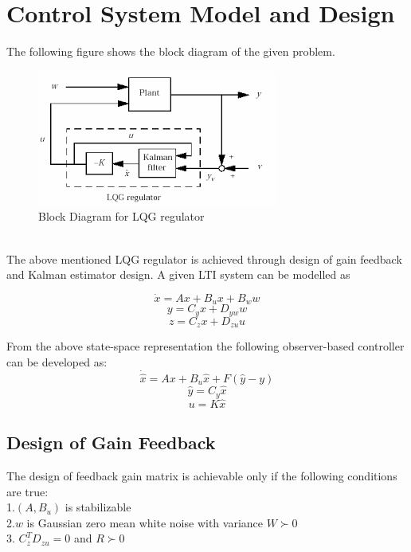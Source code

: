\documentclass[journal,onecolumn]{IEEEtran}
\begin{document}
\section{Control System Model and Design}

The following figure shows the block diagram of the given problem.
\begin{figure}[h!]
\centering

 \includegraphics[scale=1.0]{blockdiagram.png}
  \caption{Block Diagram for LQG regulator}
\end{figure}
\\
The above mentioned LQG regulator is achieved through design of gain feedback and Kalman estimator design.
A given LTI system can be modelled as 

\begin{equation}
    \dot x = Ax + B_{u}x + B_{w}w
\end{equation}
\begin{equation}
    y = C_{y}x + D_{yw}w 
    \end{equation}
    \begin{equation}
    z = C_{z}x + D_{zu}u
     \end{equation}

From the above state-space representation the following observer-based controller can be developed as:
\begin{equation}
    \dot {\hat x} = Ax + B_{u}{\hat x} + F({\hat y}-y)
\end{equation}
\begin{equation}
    {\hat y} = C_{y}{\hat x}
    \end{equation}
    \begin{equation}
    u = K{\hat x}
     \end{equation}
\subsection{Design of Gain Feedback}
The design of feedback gain matrix is achievable only if the following conditions are true:\\
1.$(A,B_u)$ is stabilizable\\
2.$w$ is Gaussian zero mean white noise with variance $W\succ0$\\
3. $C^{T}_zD_{zu} = 0$ and  $R\succ0$\\
\end{document}
